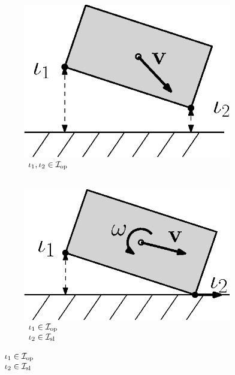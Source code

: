 \documentclass[../DC2017114Bouma.tex]{subfiles}
\begin{document}
\begin{figure}[bt!]
\centering
\begin{subfigure}[b]{0.17\textwidth}
\centering
\includegraphics[width=\textwidth]{example1.eps}
\caption{$\begin{array}{l}
\iota_1,\iota_2\in\mathcal{I}_{\textnormal{op}}\\ \hspace{0cm}
\end{array}$}
\label{fig:2example1}
\end{subfigure}
\quad
\begin{subfigure}[b]{0.17\textwidth}  
\centering 
\includegraphics[width=\textwidth]{example2.eps}
\caption{$\begin{array}{l}
\iota_1\in\mathcal{I}_{\textnormal{op}}\\\iota_2\in\mathcal{I}_{\textnormal{sl}}
\end{array}$}
\label{fig:2example2}

\end{subfigure}
\end{figure}
\end{document}
